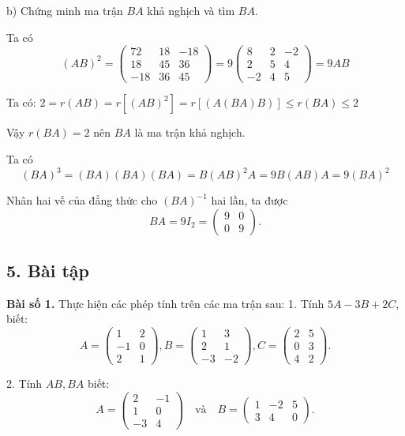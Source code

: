 b) Chứng minh ma trận \( BA \) khả nghịch và tìm \( BA \).

Ta có
\[
(AB)^2 = \begin{pmatrix}
72 & 18 & -18 \\
18 & 45 & 36 \\
-18 & 36 & 45
\end{pmatrix} = 9 \begin{pmatrix}
8 & 2 & -2 \\
2 & 5 & 4 \\
-2 & 4 & 5
\end{pmatrix} = 9AB
\]

Ta có: \( 2 = r(AB) = r[(AB)^2] = r[(A(BA)B)] \le r(BA) \le 2 \)

Vậy \( r(BA) = 2 \) nên \( BA \) là ma trận khả nghịch.

Ta có
\[
(BA)^3 = (BA)(BA)(BA) = B(AB)^2 A = 9B(AB)A = 9(BA)^2
\]

Nhân hai vế của đẳng thức cho \( (BA)^{-1} \) hai lần, ta được
\[
BA = 9I_2 = \begin{pmatrix}
9 & 0 \\
0 & 9
\end{pmatrix}.
\]
\subsection*{5. Bài tập}

\textbf{Bài số 1.} Thực hiện các phép tính trên các ma trận sau:
1. Tính \( 5A - 3B + 2C \), biết:
\[
A = \begin{pmatrix}
1 & 2 \\
-1 & 0 \\
2 & 1
\end{pmatrix},
B = \begin{pmatrix}
1 & 3 \\
2 & 1 \\
-3 & -2
\end{pmatrix},
C = \begin{pmatrix}
2 & 5 \\
0 & 3 \\
4 & 2
\end{pmatrix}.
\]

2. Tính \( AB, BA \) biết:
\[
A = \begin{pmatrix}
2 & -1 \\
1 & 0 \\
-3 & 4
\end{pmatrix}
\quad \text{và} \quad
B = \begin{pmatrix}
1 & -2 & 5 \\
3 & 4 & 0
\end{pmatrix}.
\]


